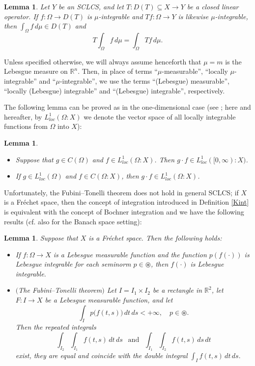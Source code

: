 \documentclass{amsart}
\newtheorem{lem}[thm]{Lemma}
\theoremstyle{definition}
\theoremstyle{remark}
\numberwithin{equation}{section}
\begin{document}
\begin{lem}\label{bnm}
Let $Y$ be an \emph{SCLCS}, and let $T\colon D(T)\subseteq X\to Y$ be a closed linear operator.
If $f\colon\Omega\to D(T)$ is $\mu$-integrable and $Tf\colon\Omega\to Y$ is likewise $\mu$-integrable, then $\int_{\Omega}f\,d\mu\in D(T)$ and 
\begin{equation*}
T\int_{\Omega}f\,d\mu=\int_{\Omega}Tf\,d\mu.
\end{equation*} 
\end{lem}

Unless specified otherwise, we will always assume henceforth that $\mu=m$ is the Lebesgue measure on ${\mathbb R}^{n}.$
Then, in place of terms ``$\mu$-measurable'', ``locally $\mu$-integrable'' and ``$\mu$-integrable'', we use the terms ``(Lebesgue) measurable'', ``locally (Lebesgue) integrable'' and ``(Lebesgue) integrable'', respectively.

The following lemma can be proved as in the one-dimensional case (see \cite[Theorem 1.1.4(i)-(ii)]{FKP}; here and hereafter, by $L_{loc}^1(\Omega:X)$ we denote the vector space of all locally integrable functions from $\Omega$ into $X$):

\begin{lem}\label{bnm1}
\begin{itemize}
\item[(i)] Suppose that $g\in C(\Omega)$ and $f\in L_{loc}^1(\Omega:X)$.
Then $g\cdot f\in L_{loc}^1([0,\infty):X)$.
\item[(ii)] If $g\in L_{loc}^1(\Omega)$ and $f\in C(\Omega:X)$, then $g\cdot f\in L_{loc}^1(\Omega:X)$.
\end{itemize}
\end{lem}

Unfortunately, the Fubini--Tonelli theorem does not hold in general SCLCS; if $X$ is a Fr\'echet space, then the concept of integration introduced in Definition \ref{Kint} is equivalent with the concept of Bochner integration and we have the following results (cf. also \cite[Theorem 1.1.9]{a43} for the Banach space setting):

\begin{lem}\label{ft}
Suppose that $X$ is a Fr\'echet space. Then the following holds:
\begin{itemize}
\item[(i)] If $f: \Omega \rightarrow X$ is a Lebesgue measurable function and the function $p(f(\cdot))$ is Lebesgue integrable for each seminorm $p\in \circledast$, then $f(\cdot)$ is Lebesgue integrable.
\item[(ii)] $($The  Fubini--Tonelli theorem$)$ Let $I=I_{1}\times I_{2}$ be a rectangle in ${\mathbb R}^{2}$,  let $F: I \rightarrow X$ be a Lebesgue measurable function, and let 
$$
\int_{I}p\bigl(f(t,s)\bigr)\, dt\, ds<+\infty,\quad p\in \circledast.
$$
Then the repeated integrals
$$
\int_{I_{2}}\int_{I_{1}}f(t,s)\, dt\, ds\ \ \mbox{ and }\ \ \int_{I_{1}}\int_{I_{2}}f(t,s)\, ds\, dt
$$
exist, they are equal and coincide with the double integral $\int_{I}f(t,s)\, dt\, ds.$
\end{itemize}
\end{lem}
\end{document}
